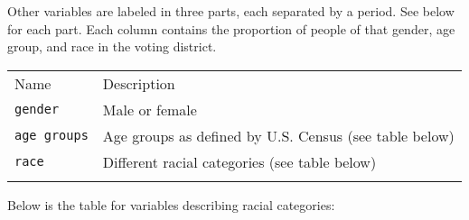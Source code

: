\documentclass[]{article}
\begin{document}
Other variables are labeled in three parts, each separated by a period.
See below for each part. Each column contains the proportion of people
of that gender, age group, and race in the voting district.

\begin{longtable}[c]{@{}ll@{}}
\toprule\addlinespace
\begin{minipage}[b]{0.24\columnwidth}\raggedright
Name
\end{minipage} & \begin{minipage}[b]{0.69\columnwidth}\raggedright
Description
\end{minipage}
\\\addlinespace
\midrule\endhead
\begin{minipage}[t]{0.24\columnwidth}\raggedright
\texttt{gender}
\end{minipage} & \begin{minipage}[t]{0.69\columnwidth}\raggedright
Male or female
\end{minipage}
\\\addlinespace
\begin{minipage}[t]{0.24\columnwidth}\raggedright
\texttt{age groups}
\end{minipage} & \begin{minipage}[t]{0.69\columnwidth}\raggedright
Age groups as defined by U.S. Census (see table below)
\end{minipage}
\\\addlinespace
\begin{minipage}[t]{0.24\columnwidth}\raggedright
\texttt{race}
\end{minipage} & \begin{minipage}[t]{0.69\columnwidth}\raggedright
Different racial categories (see table below)
\end{minipage}
\\\addlinespace
\bottomrule
\end{longtable}

Below is the table for variables describing racial categories:
\end{document}
